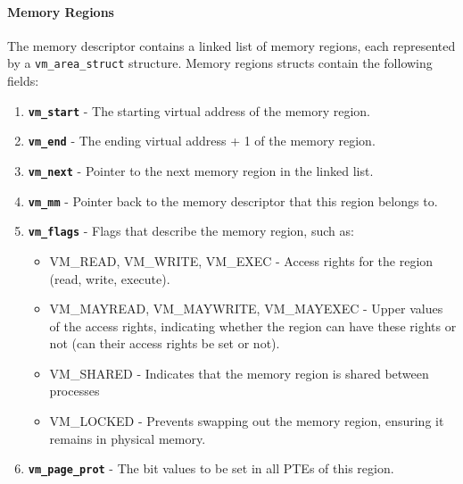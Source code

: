 \documentclass[openany,12pt]{book}
\newcommand{\code}[1]{\texttt{#1}}
\begin{document}
\paragraph{Memory Regions} The memory descriptor contains a linked list of memory regions, each represented by a \code{vm\_area\_struct} structure. Memory regions structs contain the following fields:
\begin{enumerate}
  \item \textbf{\code{vm\_start}} -  The starting virtual address of the memory region.
  
  \item \textbf{\code{vm\_end}} - The ending virtual address + 1 of the memory region.

  \item \textbf{\code{vm\_next}} - Pointer to the next memory region in the linked list.

  \item \textbf{\code{vm\_mm}} - Pointer back to the memory descriptor that this region belongs to.

  \item \textbf{\code{vm\_flags}} - Flags that describe the memory region, such as:
  \begin{itemize}
    \item VM\_READ, VM\_WRITE, VM\_EXEC - Access rights for the region (read, write, execute).

    \item VM\_MAYREAD, VM\_MAYWRITE, VM\_MAYEXEC - Upper values of the access rights, indicating whether the region can have these rights or not (can their access rights be set or not).

    \item VM\_SHARED - Indicates that the memory region is shared between processes 

    \item VM\_LOCKED - Prevents swapping out the memory region, ensuring it remains in physical memory.
  \end{itemize}

  \item \textbf{\code{vm\_page\_prot}} - The bit values to be set in all PTEs of this region.
\end{enumerate}
\end{document}
